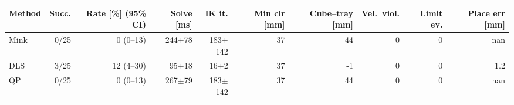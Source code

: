\begin{tabular}{lrrrrrrrrr}
\toprule
Method & Succ. & Rate [\%] (95\% CI) & Solve [ms] & IK it. & Min clr [mm] & Cube--tray [mm] & Vel.\ viol. & Limit ev. & Place err [mm]\\
\midrule
Mink & 0/25 & 0 (0--13) & 244$\pm$78 & 183$\pm$142 & 37 & 44 & 0 & 0 & nan\\
DLS & 3/25 & 12 (4--30) & 95$\pm$18 & 16$\pm$2 & 37 & -1 & 0 & 0 & 1.2\\
QP & 0/25 & 0 (0--13) & 267$\pm$79 & 183$\pm$142 & 37 & 44 & 0 & 0 & nan\\
\bottomrule
\end{tabular}
